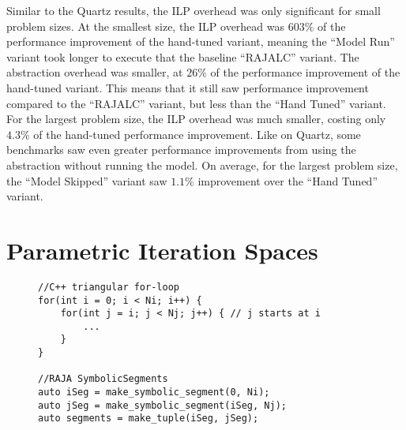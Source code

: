 Similar to the Quartz results, the ILP overhead was only significant for small problem sizes.
At the smallest size, the ILP overhead was $603\%$ of the performance improvement of the hand-tuned variant, meaning the ``Model Run'' variant took longer to execute that the baseline ``RAJALC'' variant.
The abstraction overhead was smaller, at $26\%$ of the performance improvement of the hand-tuned variant.
This means that it still saw performance improvement compared to the ``RAJALC'' variant, but less than the ``Hand Tuned'' variant.
For the largest problem size, the ILP overhead was much smaller, costing only $4.3\%$ of the hand-tuned performance improvement.
Like on Quartz, some benchmarks saw even greater performance improvements from using the \FormatDecisions{} abstraction without running the model.
On average, for the largest problem size, the ``Model Skipped'' variant saw $1.1\%$ improvement over the ``Hand Tuned'' variant.



\section{Parametric Iteration Spaces}

\begin{figure}
\begin{lstlisting}[caption={Comparison of C++ for-loop and RAJA \texttt{SymbolicSegment} representations of a loop nest with a triangular iteration space.},label=triangularComparison]
//C++ triangular for-loop
for(int i = 0; i < Ni; i++) {
	for(int j = i; j < Nj; j++) { // j starts at i
		... 
	}
}

//RAJA SymbolicSegments
auto iSeg = make_symbolic_segment(0, Ni);
auto jSeg = make_symbolic_segment(iSeg, Nj);
auto segments = make_tuple(iSeg, jSeg);
\end{lstlisting}
\end{figure}

